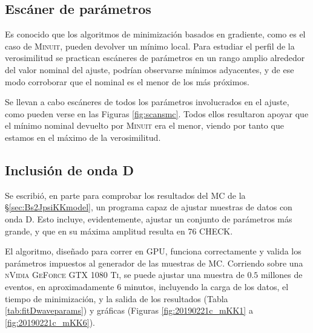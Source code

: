 
\subsection{Escáner de parámetros}

Es conocido que los algoritmos de minimización basados en gradiente, como es el caso de \textsc{Minuit}, pueden devolver un mínimo local. Para estudiar el perfil de la verosimilitud se practican escáneres de parámetros en un rango amplio alrededor del valor nominal del ajuste, podrían observarse mínimos adyacentes, y de ese modo corroborar que el nominal es el menor de los más próximos.

Se llevan a cabo escáneres de todos los parámetros involucrados en el ajuste, como pueden verse en las Figuras \ref{fig:scansmc}. Todos ellos resultaron apoyar que el mínimo nominal devuelto por \textsc{Minuit} era el menor, viendo por tanto que estamos en el máximo de la verosimilitud.

\subsection{Inclusión de onda D}

Se escribió, en parte para comprobar los resultados del MC de la \S \ref{sec:Bs2JpsiKKmodel}, un programa capaz de ajustar muestras de datos con onda D. Esto incluye, evidentemente, ajustar un conjunto de parámetros más grande, y que en su máxima amplitud resulta en 76 CHECK.

El algoritmo, diseñado para correr en GPU, funciona correctamente y valida los parámetros impuestos al generador de las muestras de MC. Corriendo sobre una \textsc{nVidia GeForce GTX 1080 Ti}, se puede ajustar una muestra de $0.5$ millones de eventos, en aproximadamente $6$ minutos, incluyendo la carga de los datos, el tiempo de minimización, y la salida de los resultados (Tabla \ref{tab:fitDwaveparams}) y gráficas (Figuras \ref{fig:20190221c_mKK1} a \ref{fig:20190221c_mKK6}).











